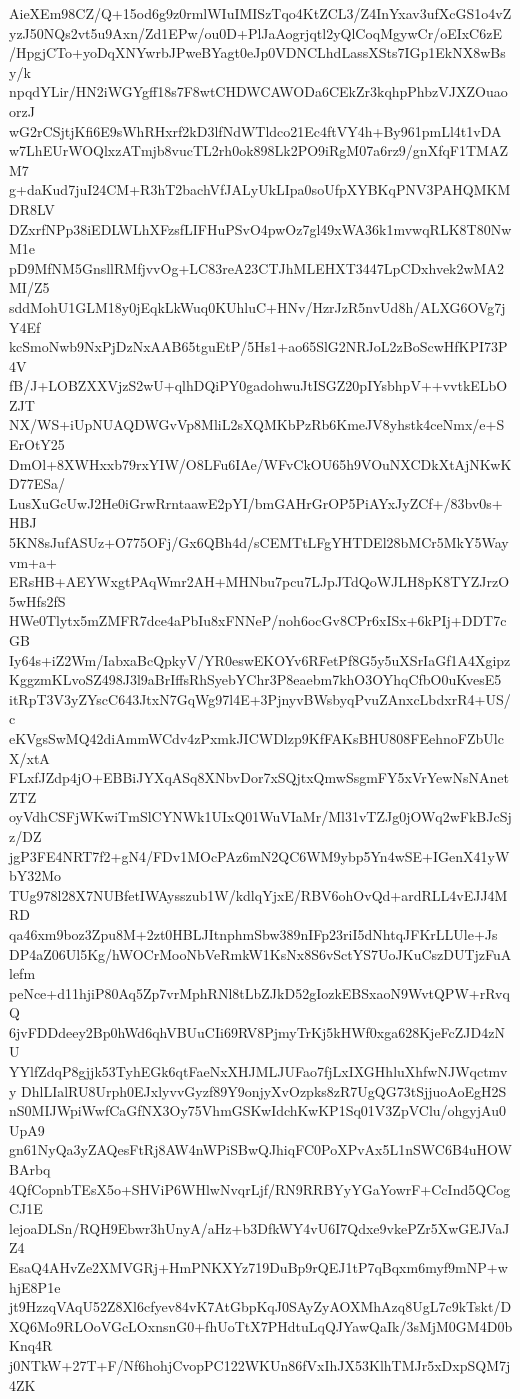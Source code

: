 AieXEm98CZ/Q+15od6g9z0rmlWIuIMISzTqo4KtZCL3/Z4InYxav3ufXcGS1o4vZ
yzJ50NQs2vt5u9Axn/Zd1EPw/ou0D+PlJaAogrjqtl2yQlCoqMgywCr/oEIxC6zE
/HpgjCTo+yoDqXNYwrbJPweBYagt0eJp0VDNCLhdLassXSts7IGp1EkNX8wBsy/k
npqdYLir/HN2iWGYgff18s7F8wtCHDWCAWODa6CEkZr3kqhpPhbzVJXZOuaoorzJ
wG2rCSjtjKfi6E9sWhRHxrf2kD3lfNdWTldco21Ec4ftVY4h+By961pmLl4t1vDA
w7LhEUrWOQlxzATmjb8vucTL2rh0ok898Lk2PO9iRgM07a6rz9/gnXfqF1TMAZM7
g+daKud7juI24CM+R3hT2bachVfJALyUkLIpa0soUfpXYBKqPNV3PAHQMKMDR8LV
DZxrfNPp38iEDLWLhXFzsfLIFHuPSvO4pwOz7gl49xWA36k1mvwqRLK8T80NwM1e
pD9MfNM5GnsllRMfjvvOg+LC83reA23CTJhMLEHXT3447LpCDxhvek2wMA2MI/Z5
sddMohU1GLM18y0jEqkLkWuq0KUhluC+HNv/HzrJzR5nvUd8h/ALXG6OVg7jY4Ef
kcSmoNwb9NxPjDzNxAAB65tguEtP/5Hs1+ao65SlG2NRJoL2zBoScwHfKPI73P4V
fB/J+LOBZXXVjzS2wU+qlhDQiPY0gadohwuJtISGZ20pIYsbhpV++vvtkELbOZJT
NX/WS+iUpNUAQDWGvVp8MliL2sXQMKbPzRb6KmeJV8yhstk4ceNmx/e+SErOtY25
DmOl+8XWHxxb79rxYIW/O8LFu6IAe/WFvCkOU65h9VOuNXCDkXtAjNKwKD77ESa/
LusXuGcUwJ2He0iGrwRrntaawE2pYI/bmGAHrGrOP5PiAYxJyZCf+/83bv0s+HBJ
5KN8sJufASUz+O775OFj/Gx6QBh4d/sCEMTtLFgYHTDEl28bMCr5MkY5Wayvm+a+
ERsHB+AEYWxgtPAqWmr2AH+MHNbu7pcu7LJpJTdQoWJLH8pK8TYZJrzO5wHfs2fS
HWe0Tlytx5mZMFR7dce4aPbIu8xFNNeP/noh6ocGv8CPr6xISx+6kPIj+DDT7cGB
Iy64s+iZ2Wm/IabxaBcQpkyV/YR0eswEKOYv6RFetPf8G5y5uXSrIaGf1A4Xgipz
KggzmKLvoSZ498J3l9aBrIffsRhSyebYChr3P8eaebm7khO3OYhqCfbO0uKvesE5
itRpT3V3yZYscC643JtxN7GqWg97l4E+3PjnyvBWsbyqPvuZAnxcLbdxrR4+US/c
eKVgsSwMQ42diAmmWCdv4zPxmkJICWDlzp9KfFAKsBHU808FEehnoFZbUlcX/xtA
FLxfJZdp4jO+EBBiJYXqASq8XNbvDor7xSQjtxQmwSsgmFY5xVrYewNsNAnetZTZ
oyVdhCSFjWKwiTmSlCYNWk1UIxQ01WuVIaMr/Ml31vTZJg0jOWq2wFkBJcSjz/DZ
jgP3FE4NRT7f2+gN4/FDv1MOcPAz6mN2QC6WM9ybp5Yn4wSE+IGenX41yWbY32Mo
TUg978l28X7NUBfetIWAysszub1W/kdlqYjxE/RBV6ohOvQd+ardRLL4vEJJ4MRD
qa46xm9boz3Zpu8M+2zt0HBLJItnphmSbw389nIFp23riI5dNhtqJFKrLLUle+Js
DP4aZ06Ul5Kg/hWOCrMooNbVeRmkW1KsNx8S6vSctYS7UoJKuCszDUTjzFuAlefm
peNce+d11hjiP80Aq5Zp7vrMphRNl8tLbZJkD52gIozkEBSxaoN9WvtQPW+rRvqQ
6jvFDDdeey2Bp0hWd6qhVBUuCIi69RV8PjmyTrKj5kHWf0xga628KjeFcZJD4zNU
YYlfZdqP8gjjk53TyhEGk6qtFaeNxXHJMLJUFao7fjLxIXGHhluXhfwNJWqctmvy
DhlLIalRU8Urph0EJxlyvvGyzf89Y9onjyXvOzpks8zR7UgQG73tSjjuoAoEgH2S
nS0MIJWpiWwfCaGfNX3Oy75VhmGSKwIdchKwKP1Sq01V3ZpVClu/ohgyjAu0UpA9
gn61NyQa3yZAQesFtRj8AW4nWPiSBwQJhiqFC0PoXPvAx5L1nSWC6B4uHOWBArbq
4QfCopnbTEsX5o+SHViP6WHlwNvqrLjf/RN9RRBYyYGaYowrF+CcInd5QCogCJ1E
lejoaDLSn/RQH9Ebwr3hUnyA/aHz+b3DfkWY4vU6I7Qdxe9vkePZr5XwGEJVaJZ4
EsaQ4AHvZe2XMVGRj+HmPNKXYz719DuBp9rQEJ1tP7qBqxm6myf9mNP+whjE8P1e
jt9HzzqVAqU52Z8Xl6cfyev84vK7AtGbpKqJ0SAyZyAOXMhAzq8UgL7c9kTskt/D
XQ6Mo9RLOoVGcLOxnsnG0+fhUoTtX7PHdtuLqQJYawQaIk/3sMjM0GM4D0bKnq4R
j0NTkW+27T+F/Nf6hohjCvopPC122WKUn86fVxIhJX53KlhTMJr5xDxpSQM7j4ZK
